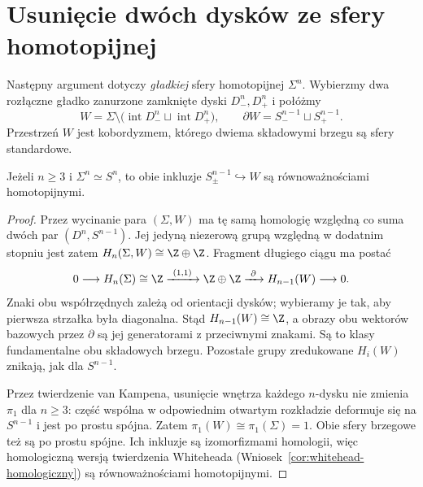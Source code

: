 \section{Usunięcie dwóch dysków ze sfery homotopijnej}
\label{sec:poincare-high}

Następny argument dotyczy \emph{gładkiej}
sfery homotopijnej $\Sigma^n$.
Wybierzmy dwa rozłączne gładko
zanurzone zamknięte dyski $D_-^n,D_+^n$
i połóżmy
\[
 W=\Sigma\setminus
   \bigl(\operatorname{int}D_-^n
          \sqcup\operatorname{int}D_+^n\bigr),
 \qquad
 \partial W=S_-^{n-1}\sqcup S_+^{n-1}.
\]
Przestrzeń $W$ jest kobordyzmem,
którego dwiema składowymi brzegu
są sfery standardowe.

\begin{lemat}
\label{lem:punctured-sphere-hc-24}
Jeżeli $n\geq3$ i $\Sigma^n\simeq S^n$,
to obie inkluzje
$S_\pm^{n-1}\hookrightarrow W$
są równoważnościami homotopijnymi.
\end{lemat}
\begin{proof}
Przez wycinanie para $(\Sigma,W)$
ma tę samą homologię względną
co suma dwóch par $(D^n,S^{n-1})$.
Jej jedyną niezerową grupą względną
w dodatnim stopniu jest zatem
$H_n(\Sigma,W)\cong\Z\oplus\Z$.
Fragment długiego ciągu ma postać
\[
 0\longrightarrow H_n(\Sigma)\cong\Z
 \xrightarrow{\ (1,1)\ }
 \Z\oplus\Z
 \xrightarrow{\ \partial\ }
 H_{n-1}(W)\longrightarrow0.
\]
Znaki obu współrzędnych zależą od
orientacji dysków; wybieramy je tak,
aby pierwsza strzałka była diagonalna.
Stąd $H_{n-1}(W)\cong\Z$, a obrazy
obu wektorów bazowych przez $\partial$
są jej generatorami z przeciwnymi znakami.
Są to klasy fundamentalne obu składowych
brzegu. Pozostałe grupy zredukowane
$H_i(W)$ znikają, jak dla $S^{n-1}$.

Przez twierdzenie van Kampena,
usunięcie wnętrza każdego $n$-dysku
nie zmienia $\pi_1$ dla $n\geq3$:
część wspólna w odpowiednim otwartym
rozkładzie deformuje się na
$S^{n-1}$ i jest po prostu spójna.
Zatem $\pi_1(W)\cong\pi_1(\Sigma)=1$.
Obie sfery brzegowe też są po prostu
spójne. Ich inkluzje są izomorfizmami
homologii, więc homologiczną wersją
twierdzenia Whiteheada
(Wniosek~\ref{cor:whitehead-homologiczny})
są równoważnościami homotopijnymi.
\end{proof}


